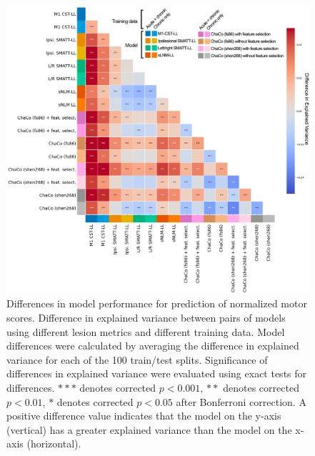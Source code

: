 \documentclass[10pt]{article}
\begin{document}
\begin{figure}[htp]
\centering
\includegraphics[width=1\linewidth]{figures/analysis_1_matrix_figure_colors.png}
\caption{Differences in model performance for prediction of normalized motor scores. Difference in explained variance between pairs of models using different lesion metrics and different training data. Model differences were calculated by averaging the difference in explained variance for each of the 100 train/test splits. Significance of differences in explained variance were evaluated using exact tests for differences. $***$ denotes corrected $p < 0.001$, $**$ denotes corrected $p < 0.01$, $*$ denotes corrected $p < 0.05$ after Bonferroni correction. A positive difference value indicates that the model on the y-axis (vertical) has a greater explained variance than the model on the x-axis (horizontal).
 }
\label{analysis1}
\end{figure}
\end{document}
